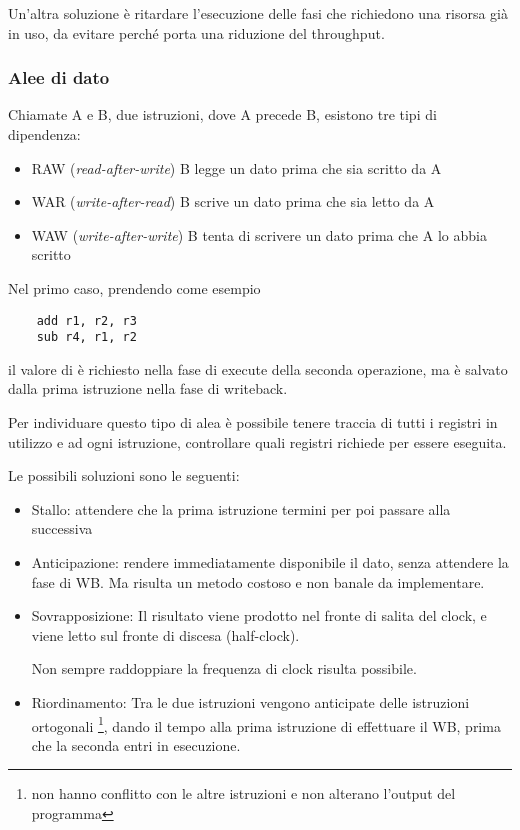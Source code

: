 \documentclass[../template]{subfiles}
\begin{document}
Un'altra soluzione è ritardare l'esecuzione delle fasi che richiedono una risorsa già in uso, da evitare perché porta una riduzione del throughput.

\subsubsection{Alee di dato}
Chiamate A e B, due istruzioni, dove A precede B, esistono tre tipi di dipendenza:
\begin{itemize}
    \item RAW (\textit{read-after-write}) B legge un dato prima che sia scritto da A
    \item WAR (\textit{write-after-read}) B scrive un dato prima che sia letto da A
    \item WAW (\textit{write-after-write}) B tenta di scrivere un dato prima che A lo abbia scritto
\end{itemize}
Nel primo caso, prendendo come esempio
\begin{lstlisting}
    add r1, r2, r3
    sub r4, r1, r2
\end{lstlisting}
il valore di  è richiesto nella fase di execute della seconda operazione, ma è salvato dalla prima istruzione nella fase di writeback.

Per individuare questo tipo di alea è possibile tenere traccia di tutti i registri in utilizzo e ad ogni istruzione, controllare quali registri richiede per essere eseguita.

Le possibili soluzioni sono le seguenti:
\begin{itemize}
    \item Stallo: attendere che la prima istruzione termini per poi passare alla successiva
    \item Anticipazione: rendere immediatamente disponibile il dato, senza attendere la fase di WB.
        Ma risulta un metodo costoso e non banale da implementare.
    \item Sovrapposizione:
        Il risultato viene prodotto nel fronte di salita del clock, e viene letto sul fronte di discesa (half-clock).

        Non sempre raddoppiare la frequenza di clock risulta possibile.
    \item Riordinamento:
        Tra le due istruzioni vengono anticipate delle istruzioni ortogonali
        \footnote{non hanno conflitto con le altre istruzioni e non alterano l'output del programma},
        dando il tempo alla prima istruzione di effettuare il WB, prima che la seconda entri in esecuzione.
\end{itemize}
\end{document}
